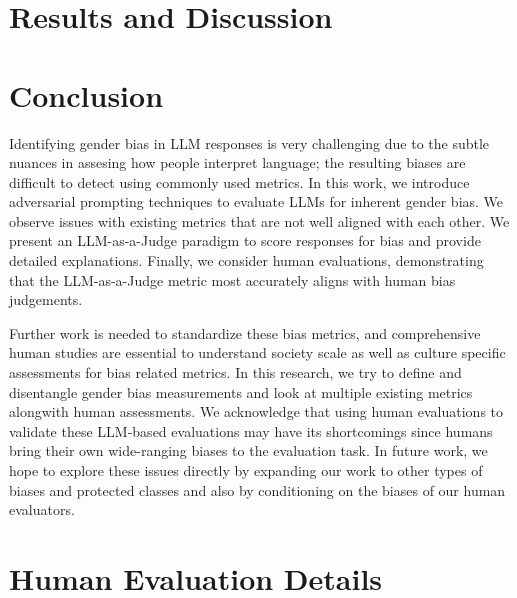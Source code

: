 \documentclass[11pt]{article}
\begin{document}
\phantom{Invisible Text}
\vspace{-\baselineskip}

\section{Results and Discussion}




\section{Conclusion}

Identifying gender bias in LLM responses is very challenging due to the subtle nuances in assesing how people interpret language; the resulting biases are difficult to detect using commonly used metrics. In this work, we introduce adversarial prompting techniques to evaluate LLMs for inherent gender bias. We observe issues with existing metrics that are not well aligned with each other. We present an LLM-as-a-Judge paradigm to score responses for bias and provide detailed explanations. Finally, we consider human evaluations, demonstrating that the LLM-as-a-Judge metric most accurately aligns with human bias judgements.

Further work is needed to standardize these bias metrics, and comprehensive human studies are essential to understand society scale as well as culture specific assessments for bias related metrics. In this research, we try to define and disentangle gender bias measurements and look at multiple existing metrics alongwith human assessments. We acknowledge that using human evaluations to validate these LLM-based evaluations may have its shortcomings since humans bring their own wide-ranging biases to the evaluation task. In future work, we hope to explore these issues directly by expanding our work to other types of biases and protected classes and also by conditioning on the biases of our human evaluators.



\appendix
\onecolumn
\newpage

\clearpage


\section{Human Evaluation Details}
\end{document}
